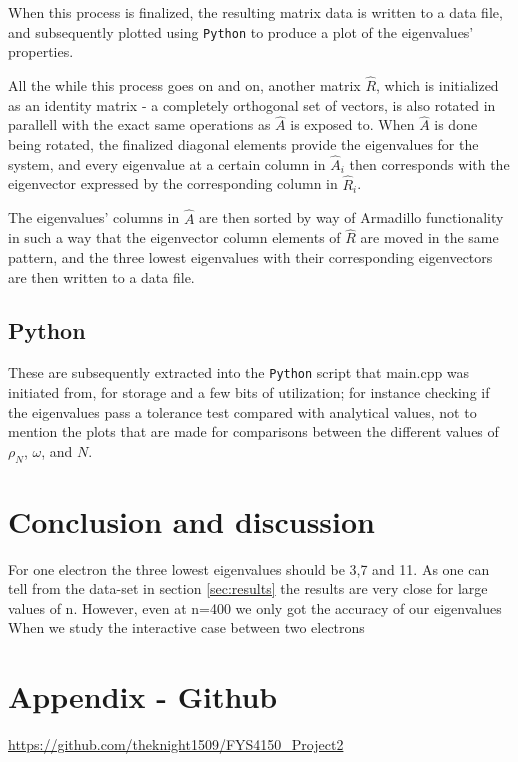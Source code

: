 \documentclass[11pt,a4paper,notitlepage]{article}
\begin{document}
  When this process is finalized, the resulting matrix data is written to a data file, and subsequently plotted using \verb|Python| to produce a plot of the eigenvalues' properties.
  
  All the while this process goes on and on, another matrix $\hat{R}$, which is initialized as an identity matrix - a completely orthogonal set of vectors, is also rotated in parallell with the exact same operations as $\hat{A}$ is exposed to. When $\hat{A}$ is done being rotated, the finalized diagonal elements provide the eigenvalues for the system, and every eigenvalue at a certain column in $\hat{A}_i$ then corresponds with the eigenvector expressed by the corresponding column in $\hat{R}_i$.
 
 The eigenvalues' columns in $\hat{A}$ are then sorted by way of Armadillo functionality in such a way that the eigenvector column elements of $\hat{R}$ are moved in the same pattern, and the three lowest eigenvalues with their corresponding eigenvectors are then written to a data file.
 
 \subsection{Python}
 These are subsequently extracted into the \verb|Python| script that main.cpp was initiated from, for storage and a few bits of utilization; for instance checking if the eigenvalues pass a tolerance test compared with analytical values, not to mention the plots that are made for comparisons between the different values of $\rho_N$, $\omega$, and $N$.

\section{Conclusion and discussion}
For one electron the three lowest eigenvalues should be 3,7 and 11. As one can tell from the data-set in section \ref{sec:results} the results are very close for large values of n. However, even at n=400 we only got the accuracy of our eigenvalues
When we study the interactive case between two electrons 

\section{Appendix - Github} \label{section:github}
\url{https://github.com/theknight1509/FYS4150_Project2}
\end{document}
